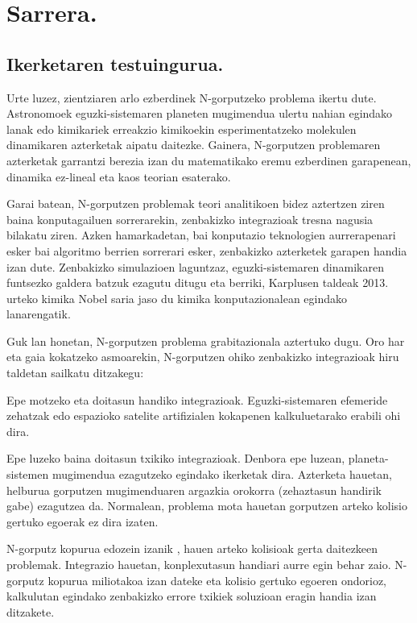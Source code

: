 \chapter{Sarrera.}


\section{Ikerketaren testuingurua.}

Urte luzez, zientziaren arlo ezberdinek N-gorputzeko problema ikertu dute. Astronomoek eguzki-sistemaren planeten mugimendua ulertu nahian egindako lanak edo kimikariek erreakzio kimikoekin esperimentatzeko molekulen dinamikaren azterketak aipatu daitezke. Gainera,  N-gorputzen problemaren azterketak garrantzi berezia izan du matematikako eremu ezberdinen garapenean,  dinamika ez-lineal eta kaos teorian esaterako. 

Garai batean, N-gorputzen problemak teori analitikoen bidez aztertzen ziren baina konputagailuen sorrerarekin, zenbakizko integrazioak tresna nagusia bilakatu ziren. Azken hamarkadetan, bai konputazio teknologien aurrerapenari esker bai algoritmo berrien sorrerari esker, zenbakizko azterketek garapen handia izan dute. Zenbakizko simulazioen laguntzaz, eguzki-sistemaren dinamikaren funtsezko galdera batzuk ezagutu ditugu eta berriki, Karplusen taldeak 2013. urteko kimika Nobel saria \cite{Karplus2014} jaso du kimika konputazionalean egindako lanarengatik.       

Guk lan honetan, N-gorputzen problema grabitazionala aztertuko dugu. Oro har eta gaia kokatzeko asmoarekin, N-gorputzen ohiko zenbakizko  integrazioak hiru taldetan sailkatu ditzakegu:
\begin{enumerate}
{
\item Epe motzeko eta doitasun handiko integrazioak. 
 Eguzki-sistemaren efemeride zehatzak \cite{Folkner2014} edo espazioko satelite artifizialen kokapenen \cite{Beylkin2014} kalkuluetarako erabili ohi dira.
\item Epe luzeko baina doitasun txikiko integrazioak.
 Denbora epe luzean, planeta-sistemen mugimendua ezagutzeko egindako ikerketak dira. Azterketa hauetan, helburua gorputzen mugimenduaren argazkia orokorra (zehaztasun handirik gabe) ezagutzea da. Normalean, problema mota hauetan gorputzen arteko kolisio gertuko egoerak ez dira izaten.     
\item N-gorputz kopurua edozein izanik , hauen arteko kolisioak gerta daitezkeen problemak.
 Integrazio hauetan, konplexutasun handiari aurre egin behar zaio. N-gorputz kopurua miliotakoa \cite{Ishiyama2012} izan dateke eta kolisio gertuko egoeren ondorioz, kalkulutan egindako zenbakizko errore txikiek soluzioan eragin handia izan ditzakete.    
}
\end{enumerate}

